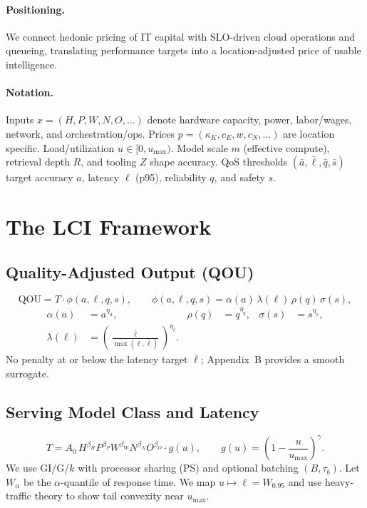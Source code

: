 ﻿\documentclass[12pt]{article}
\numberwithin{equation}{section}
\newcommand{\QOU}{\mathrm{QOU}}
\begin{document}
\paragraph{Positioning.} We connect hedonic pricing of IT capital \citep{Triplett1989,Pakes2003,Byrne2017} with SLO-driven cloud operations and queueing, translating performance targets into a location-adjusted price of usable intelligence.

\paragraph{Notation.} Inputs $x=(H,P,W,N,O,\dots)$ denote hardware capacity, power, labor/wages, network, and orchestration/ops. Prices $p=(\kappa_K,c_E,w,c_N,\dots)$ are location specific. Load/utilization $u\in[0,u_{\max})$. Model scale $m$ (effective compute), retrieval depth $R$, and tooling $Z$ shape accuracy. QoS thresholds $(\bar a,\bar \ell,\bar q,\bar s)$ target accuracy $a$, latency $\ell$ (p95), reliability $q$, and safety $s$.

\section{The LCI Framework}

\subsection{Quality-Adjusted Output (QOU)}
\begin{equation}
\QOU = T \cdot \phi(a,\ell,q,s),\qquad 
\phi(a,\ell,q,s)=\alpha(a)\,\lambda(\ell)\,\rho(q)\,\sigma(s),
\end{equation}
\begin{align}
\alpha(a)&=a^{\eta_a}, &
\rho(q)&=q^{\eta_q}, &
\sigma(s)&=s^{\eta_s},\\
\lambda(\ell)&=
\left(\frac{\bar\ell}{\max(\ell,\bar\ell)}\right)^{\eta_\ell}.
\end{align}
No penalty at or below the latency target $\bar\ell$; Appendix~B provides a smooth surrogate.

\subsection{Serving Model Class and Latency}
\begin{equation}
T = A_0\,H^{\beta_H} P^{\beta_P} W^{\beta_W} N^{\beta_N} O^{\beta_O}\cdot g(u),\qquad
g(u)=\left(1-\frac{u}{u_{\max}}\right)^{\gamma}.
\end{equation}
We use GI/G/$k$ with processor sharing (PS) and optional batching $(B,\tau_b)$. Let $W_\alpha$ be the $\alpha$-quantile of response time. We map $u\mapsto \ell=W_{0.95}$ and use heavy-traffic theory to show tail convexity near $u_{\max}$.
\end{document}
